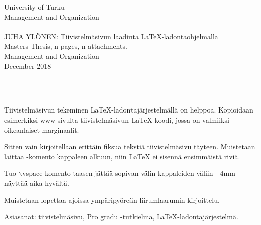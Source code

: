 \documentclass[a4paper,12pt,twoside]{article} %
\begin{document}
\begin{minipage}{15cm}

\noindent
University of Turku\\
Management and Organization\\
\\
JUHA YLÖNEN: Tiivistelmäsivun laadinta LaTeX-ladontaohjelmalla\\
Masters Thesis, n pages, n attachments.\\
Management and Organization\\
December 2018\\
\rule{\textwidth}{.2mm}\\
\\
Tiivistelmäsivun tekeminen LaTeX-ladontajärjestelmällä on helppoa. Kopioidaan esimerkiksi www-sivulta tiivistelmäsivun LaTeX-koodi, jossa on valmiiksi oikeanlaiset marginaalit.

\vspace{4mm}\noindent Sitten vain kirjoitellaan erittäin fiksua tekstiä tiivistelmäsivu täyteen. Muistetaan laittaa \noindent-komento kappaleen
alkuun, niin LaTeX ei sisennä ensimmäistä riviä.

\vspace{4mm}\noindent Tuo $\backslash$vspace-komento taasen jättää sopivan välin kappaleiden väliin - 4mm näyttää aika hyvältä.

\vspace{4mm}\noindent Muistetaan lopettaa ajoissa ympäripyöreän liirumlaarumin kirjoittelu.

\vspace{4mm}\noindent Asiasanat: tiivistelmäsivu, Pro gradu -tutkielma, LaTeX-ladontajärjestelmä.

\end{minipage}

\cleardoublepage

\tableofcontents
\clearpage

\pagestyle{plain} 
\setcounter{page}{1}

\addtolength{\oddsidemargin}{1.1cm}
\addtolength{\voffset}{2.3cm}


\clearpage

\clearpage

\clearpage

\clearpage

\clearpage



\end{document}
